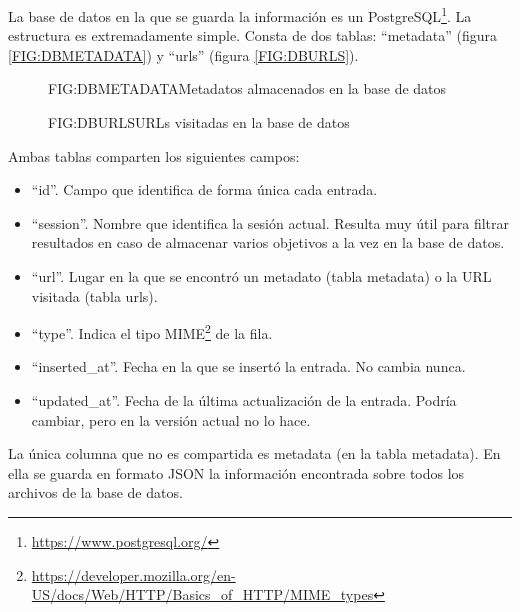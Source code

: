 La base de datos en la que se guarda la información es un PostgreSQL\footnote{\url{https://www.postgresql.org/}}. La estructura es extremadamente simple. Consta de dos tablas: ``metadata'' (figura \ref{FIG:DBMETADATA}) y ``urls'' (figura \ref{FIG:DBURLS}).

\begin{figure}[dbmetadata]{FIG:DBMETADATA}{Metadatos almacenados en la base de datos}
\end{figure}

\begin{figure}[dburls]{FIG:DBURLS}{URLs visitadas en la base de datos}
\end{figure}

Ambas tablas comparten los siguientes campos:
\begin{itemize}
  \item ``id''. Campo que identifica de forma única cada entrada.
  \item ``session''. Nombre que identifica la sesión actual. Resulta muy útil para filtrar resultados en caso de almacenar varios objetivos a la vez en la base de datos.
  \item ``url''. Lugar en la que se encontró un metadato (tabla metadata) o la URL visitada (tabla urls).
  \item ``type''. Indica el tipo MIME\footnote{\url{https://developer.mozilla.org/en-US/docs/Web/HTTP/Basics_of_HTTP/MIME_types}} de la fila.
  \item ``inserted\_at''. Fecha en la que se insertó la entrada. No cambia nunca.
  \item ``updated\_at''. Fecha de la última actualización de la entrada. Podría cambiar, pero en la versión actual no lo hace.
\end{itemize}

La única columna que no es compartida es metadata (en la tabla metadata). En ella se guarda en formato JSON la información encontrada sobre todos los archivos de la base de datos.
